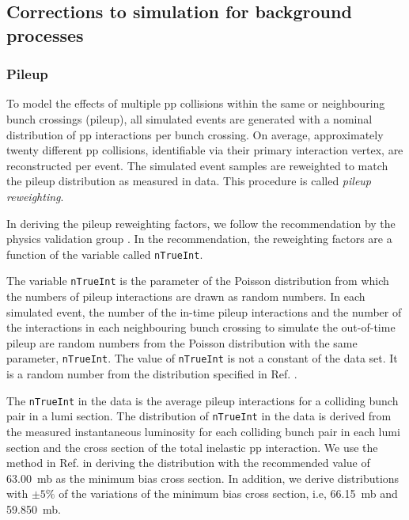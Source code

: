 \subsection{Corrections to simulation for background processes}
\label{sec:sim-corrs}

\subsubsection{Pileup}
\label{sec:pileup-reweighting}

To model the effects of multiple pp collisions within the same or
neighbouring bunch crossings (pileup), all simulated events are
generated with a nominal distribution of pp interactions per bunch
crossing. On average, approximately twenty different pp collisions,
identifiable via their primary interaction vertex, are reconstructed
per event. The simulated event samples are reweighted to match the
pileup distribution as measured in data. This procedure is called
\textit{pileup reweighting}.

In deriving the pileup reweighting factors, we follow the
recommendation by the physics validation group
\cite{twiki-PdmVPileUpDescription, twiki-PileupJSONFileforData}. In
the recommendation, the reweighting factors are a function of the
variable called \verb!nTrueInt!.

The variable \verb!nTrueInt! is the parameter of the Poisson
distribution from which the numbers of pileup interactions are drawn
as random numbers. In each simulated event, the number of the in-time
pileup interactions and the number of the interactions in each
neighbouring bunch crossing to simulate the out-of-time pileup are
random numbers from the Poisson distribution with the same parameter,
\verb!nTrueInt!. The value of \verb!nTrueInt! is not a constant of the
data set. It is a random number from the distribution specified in
Ref. \cite{github-mix_2016_25ns_SpringMC_PUScenarioV1_PoissonOOTPU_cfi}.

The \verb!nTrueInt! in the data is the average pileup interactions for
a colliding bunch pair in a lumi section. The distribution of
\verb!nTrueInt! in the data is derived from the measured instantaneous
luminosity for each colliding bunch pair in each lumi section and the
cross section of the total inelastic pp interaction. We use the method
in Ref. \cite{twiki-PileupJSONFileforData} in deriving the
distribution with the recommended value of 63.00~mb as the minimum
bias cross section. In addition, we derive distributions with $\pm
5\%$ of the variations of the minimum bias cross section, i.e,
66.15~mb and 59.850~mb.

